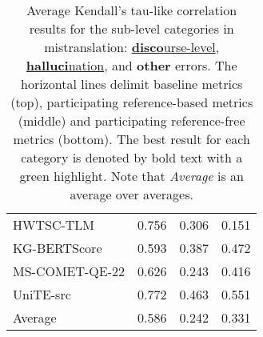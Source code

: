 \documentclass[11pt]{article}
\begin{document}
\begin{table}[t]
\begin{tabular}{@{}lccc@{}}
HWTSC-TLM               & \phantom{-}0.756                                          & \phantom{-}0.306                                              & \phantom{-}0.151                                      \\
KG-BERTScore            & \phantom{-}0.593                                          & \phantom{-}0.387                                              & \phantom{-}0.472                                      \\
MS-COMET-QE-22          & \phantom{-}0.626                                          & \phantom{-}0.243                                              & \phantom{-}0.416                                      \\
UniTE-src               & \phantom{-}0.772                                          & \phantom{-}0.463                                              & \phantom{-}0.551                                      \\
\midrule
Average                 & \phantom{-}0.586                                          & \phantom{-}0.242                                              & \phantom{-}0.331                                     \\
\bottomrule
\end{tabular}
\caption{Average Kendall’s tau-like correlation results for the sub-level categories in mistranslation: \hyperref[sec:discourse]{\textbf{disco}urse-level}, \hyperref[sec:hallucination]{\textbf{halluci}nation}, and \textbf{other} errors.  The horizontal lines delimit baseline metrics (top), participating reference-based metrics (middle) and participating reference-free metrics (bottom). The best result for each category is denoted by bold text with a green highlight. Note that \textit{Average} is an average over averages.}
\label{tab:analysis_mistranslation}
\end{table}
 
\end{document}
